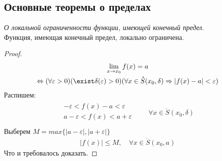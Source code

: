 \subsection{Основные теоремы о пределах}

\begin{theorem}
  \textit{О локальной ограниченности функции, имеющей конечный предел}. \\
  Функция, имеющая конечный предел, локально ограничена.
\end{theorem}
\begin{proof}
  \begin{gather*}
    \lim_{x \to x_0} f(x) = a \\
    \iff (\forall \varepsilon > 0)(\exist \delta(\varepsilon) > 0) (\forall x \in \mathring{S}(x_0, \delta) \implies |f(x) - a| < \varepsilon) \\
  \end{gather*}
  Распишем:
  \begin{gather*}
    \begin{matrix}
      - \varepsilon < f(x) - a < \varepsilon \\
      a - \varepsilon < f(x) < a + \varepsilon \\
    \end{matrix}
    \qquad
    \forall  x \in \mathring{S}(x_0, \delta)
  \end{gather*}
  Выберем $M = max\{|a - \varepsilon|, |a + \varepsilon|\}$ 
  \begin{gather*}
    |f(x)| \le  M, \quad \forall  x \in  \mathring{S}(x_0, a)
  \end{gather*}
  Что и требовалось доказать.
\end{proof}

